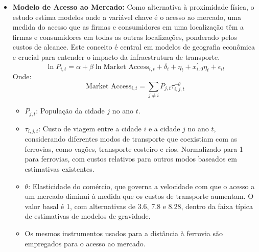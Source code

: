 \documentclass[12pt]{article}
\begin{document}
\begin{itemize}
\begin{itemize}
        \item A identificação se baseia em como a proximidade a este plano hipotético prevê tendências de tempo diferenciais na proximidade ferroviária.
    \end{itemize}
    \item \textbf{Modelo de Acesso ao Mercado:} Como alternativa à proximidade física, o estudo estima modelos onde a variável chave é o acesso ao mercado, uma medida do acesso que as firmas e consumidores em uma localização têm a firmas e consumidores em todas as outras localizações, ponderado pelos custos de alcance. Este conceito é central em modelos de geografia econômica e crucial para entender o impacto da infraestrutura de transporte.
    \begin{equation} \label{eq:india_market_access_pop}
        \ln P_{i,t} = \alpha + \beta \ln \text{Market Access}_{i,t} + \delta_i + \eta_t + x_{i,0}^{\prime}\eta_t + \epsilon_{it}
    \end{equation}
    Onde:
    \begin{equation} \label{eq:india_market_access_def}
        \text{Market Access}_{i,t} = \sum_{j \neq i} P_{j,t} \tau_{i,j,t}^{-\theta}
    \end{equation}
    \begin{itemize}
        \item $P_{j,t}$: População da cidade $j$ no ano $t$.
        \item $\tau_{i,j,t}$: Custo de viagem entre a cidade $i$ e a cidade $j$ no ano $t$, considerando diferentes modos de transporte que coexistiam com as ferrovias, como vagões, transporte costeiro e rios. Normalizado para 1 para ferrovias, com custos relativos para outros modos baseados em estimativas existentes.
        \item $\theta$: Elasticidade do comércio, que governa a velocidade com que o acesso a um mercado diminui à medida que os custos de transporte aumentam. O valor basal é 1, com alternativas de 3.6, 7.8 e 8.28, dentro da faixa típica de estimativas de modelos de gravidade.
        \item Os mesmos instrumentos usados para a distância à ferrovia são empregados para o acesso ao mercado.
    \end{itemize}
\end{itemize}
\end{document}
